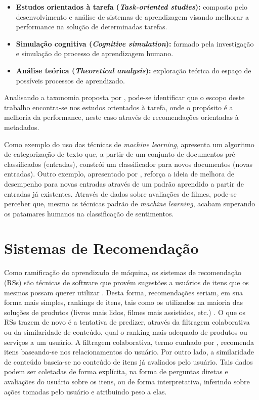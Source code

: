 \begin{itemize}
	\item \textbf{Estudos orientados à tarefa (\textit{Task-oriented studies}):} composto pelo desenvolvimento e análise de sistemas de aprendizagem visando melhorar a performance na solução de determinadas tarefas.

	\item \textbf{Simulação cognitiva (\textit{Cognitive simulation}):} formado pela investigação e simulação do processo de aprendizagem humano.

	\item \textbf{Análise teórica (\textit{Theoretical analysis}):} exploração teórica do espaço de possíveis processos de aprendizado.
\end{itemize}

Analisando a taxonomia proposta por , pode-se identificar que o escopo deste trabalho encontra-se nos estudos orientados à tarefa, onde o propósito é a melhoria da performance, neste caso através de recomendações orientadas à metadados.

Como exemplo do uso das técnicas de \textit{machine learning},   apresenta um algoritmo de categorização de texto que, a partir de um conjunto de documentos pré-classificados (entradas), constrói um classificador para novos documentos (novas entradas). Outro exemplo, apresentado por , reforça a ideia de melhora de desempenho para novas entradas através de um padrão aprendido a partir de entradas já existentes. Através de dados sobre avaliações de filmes, pode-se perceber que, mesmo as técnicas padrão de \textit{machine learning}, acabam superando os patamares humanos na classificação de sentimentos.

\section{Sistemas de Recomendação} \label{recommender_systems}

Como ramificação do aprendizado de máquina, os sistemas de recomendação (RSs) são técnicas de software que provém sugestões a usuários de itens que os mesmos possam querer utilizar \cite{resnick1997recommender, schafer1999recommender}. Desta forma, recomendações seriam, em sua forma mais simples, rankings de itens, tais como os utilizados na maioria das soluções de produtos (livros mais lidos, filmes mais assistidos, etc.) \cite{ricci2011introduction}. O que os RSs trazem de novo é a tentativa de predizer, através da filtragem colaborativa ou da similaridade de conteúdo, qual o ranking mais adequado de produtos ou serviços a um usuário. A filtragem colaborativa, termo cunhado por , recomenda itens baseando-se nos relacionamentos do usuário. Por outro lado, a similaridade de conteúdo baseia-se no conteúdo de itens já avaliados pelo usuário. Tais dados podem ser coletadas de forma explícita, na forma de perguntas diretas e avaliações do usuário sobre os itens, ou de forma interpretativa, inferindo sobre ações tomadas pelo usuário e atribuindo peso a elas.

